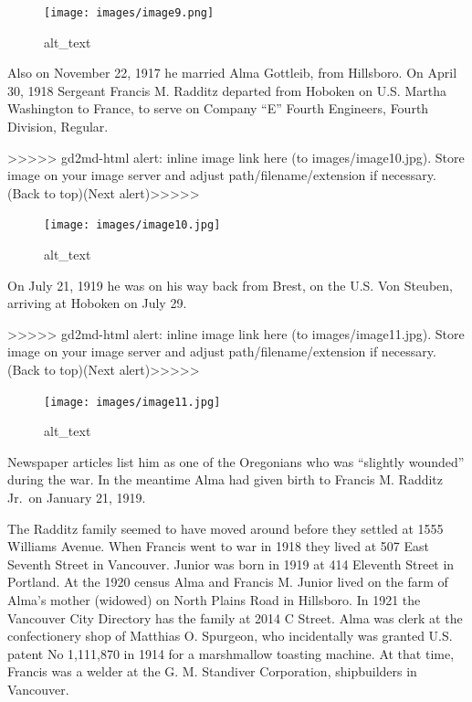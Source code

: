 \documentclass[
  12pt,
]{book}
\begin{document}
\begin{figure}
\centering
\texttt{[image: images/image9.png]}
\caption{alt\_text}
\end{figure}

Also on November 22, 1917 he married Alma Gottleib, from Hillsboro. On April 30, 1918 Sergeant Francis M. Radditz departed from Hoboken on U.S. Martha Washington to France, to serve on Company ``E'' Fourth Engineers, Fourth Division, Regular.

{\textgreater\textgreater\textgreater\textgreater\textgreater{} gd2md-html alert: inline image link here (to images/image10.jpg). Store image on your image server and adjust path/filename/extension if necessary. }(Back to top)(Next alert){\textgreater\textgreater\textgreater\textgreater\textgreater{} }

\begin{figure}
\centering
\texttt{[image: images/image10.jpg]}
\caption{alt\_text}
\end{figure}

On July 21, 1919 he was on his way back from Brest, on the U.S. Von Steuben, arriving at Hoboken on July 29.

{\textgreater\textgreater\textgreater\textgreater\textgreater{} gd2md-html alert: inline image link here (to images/image11.jpg). Store image on your image server and adjust path/filename/extension if necessary. }(Back to top)(Next alert){\textgreater\textgreater\textgreater\textgreater\textgreater{} }

\begin{figure}
\centering
\texttt{[image: images/image11.jpg]}
\caption{alt\_text}
\end{figure}

Newspaper articles list him as one of the Oregonians who was ``slightly wounded'' during the war. In the meantime Alma had given birth to Francis M. Radditz Jr.~on January 21, 1919.

The Radditz family seemed to have moved around before they settled at 1555 Williams Avenue. When Francis went to war in 1918 they lived at 507 East Seventh Street in Vancouver. Junior was born in 1919 at 414 Eleventh Street in Portland. At the 1920 census Alma and Francis M. Junior lived on the farm of Alma's mother (widowed) on North Plains Road in Hillsboro. In 1921 the Vancouver City Directory has the family at 2014 C Street. Alma was clerk at the confectionery shop of Matthias O. Spurgeon, who incidentally was granted U.S. patent No 1,111,870 in 1914 for a marshmallow toasting machine. At that time, Francis was a welder at the G. M. Standiver Corporation, shipbuilders in Vancouver.
\end{document}
